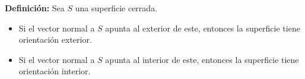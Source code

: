 \documentclass[fleqn]{article}
\begin{document}
\begin{itemize}
        \begin{figure}[htbp]
            \centering
        \end{figure}
    \end{itemize}

    \textbf{Definición:} Sea $ S $ una superficie cerrada. 

    \begin{itemize}
        \item Si el vector normal a $ S $ apunta al exterior de este, entonces la superficie tiene orientación exterior. 
        \item Si el vector normal a $ S $ apunta al interior de este, entonces la superficie tiene orientación interior.
    \end{itemize}
    
\end{document}
